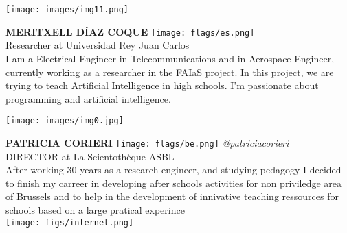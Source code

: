 \noindent
\begin{minipage}{0.3\textwidth}
\centering
\texttt{[image: images/img11.png]}
\end{minipage}
\hfill
\begin{minipage}{0.6\textwidth}\raggedright
\color{color1}\uppercase{\textbf{Meritxell Díaz Coque}}
\color{color2}\hspace{0.2cm}\texttt{[image: flags/es.png]}
\\
Researcher at Universidad Rey Juan Carlos\\
{\footnotesize I am a Electrical Engineer in Telecommunications and in Aerospace Engineer, currently working as a researcher in the FAIaS project. In this project, we are trying to teach Artificial Intelligence in high schools. I'm passionate about programming and artificial intelligence.}\\
\end{minipage}
\newline\newline\newline

\noindent
\begin{minipage}{0.3\textwidth}
\centering
\texttt{[image: images/img0.jpg]}
\end{minipage}
\hfill
\begin{minipage}{0.6\textwidth}\raggedright
\color{color1}\uppercase{\textbf{Patricia Corieri}}
\color{color2}\hspace{0.2cm}\texttt{[image: flags/be.png]}
\hspace{0.2cm}\textit{@patriciacorieri}
\\
DIRECTOR at La Scientothèque ASBL\\
{\footnotesize After working 30 years as a research engineer, and studying pedagogy I decided  to finish my carreer in developing after schools activities for non priviledge area of Brussels and to help in the development of innivative teaching ressources for schools based on a large pratical experince}\\
\texttt{[image: figs/internet.png]}
\end{minipage}
\newline\newline\newline

